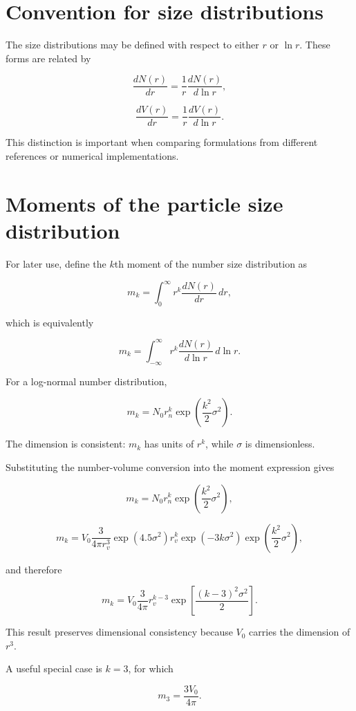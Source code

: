 \documentclass[
  letterpaper,
]{scrbook}
\begin{document}
\section{Convention for size
distributions}\label{convention-for-size-distributions}

The size distributions may be defined with respect to either \(r\) or
\(\ln r\). These forms are related by

\[
\frac{d N(r)}{d r}=\frac{1}{r}\frac{d N(r)}{d \ln r},
\]

\[
\frac{d V(r)}{d r}=\frac{1}{r}\frac{d V(r)}{d \ln r}.
\]

This distinction is important when comparing formulations from different
references or numerical implementations.

\section{Moments of the particle size
distribution}\label{moments-of-the-particle-size-distribution}

For later use, define the \(k\)th moment of the number size distribution
as

\[
m_k=\int_{0}^{\infty} r^k \frac{d N(r)}{d r} \, d r,
\]

which is equivalently

\[
m_k=\int_{-\infty}^{\infty} r^k \frac{d N(r)}{d \ln r} \, d \ln r.
\]

For a log-normal number distribution,

\[
m_k=N_0 r_n^k \exp\left(\frac{k^2}{2} \sigma^2\right).
\]

The dimension is consistent: \(m_k\) has units of \(r^k\), while
\(\sigma\) is dimensionless.

Substituting the number-volume conversion into the moment expression
gives

\[
m_k=N_0 r_n^k \exp\left(\frac{k^2}{2} \sigma^2\right),
\]

\[
m_k=V_{0} \frac{3}{4 \pi r_{v}^3}\exp(4.5 \sigma^2)r^k_{v} \exp(-3k \sigma^2) \exp\left(\frac{k^2}{2} \sigma^2\right),
\]

and therefore

\[
m_k=V_{0} \frac{3}{4 \pi} r^{k-3}_v\exp\left[\frac{(k-3)^2\sigma^2}{2} \right].
\]

This result preserves dimensional consistency because \(V_0\) carries
the dimension of \(r^3\).

A useful special case is \(k=3\), for which

\[
m_3=\frac{3V_0}{4\pi}.
\]
\end{document}
